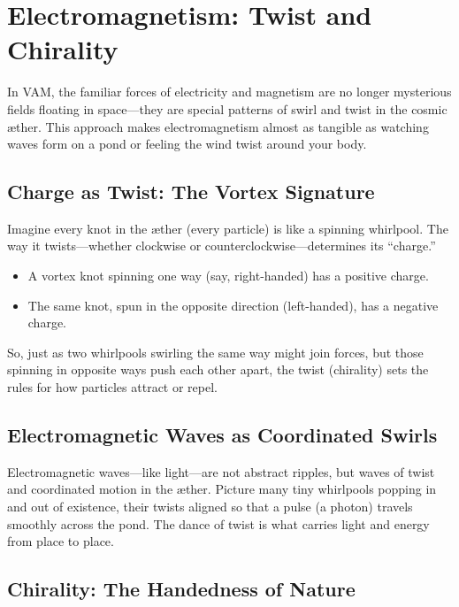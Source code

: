 
\section{Electromagnetism: Twist and Chirality}

In VAM, the familiar forces of electricity and magnetism are no longer mysterious fields floating in space—they are special patterns of swirl and twist in the cosmic æther. This approach makes electromagnetism almost as tangible as watching waves form on a pond or feeling the wind twist around your body.


\subsection*{Charge as Twist: The Vortex Signature}

Imagine every knot in the æther (every particle) is like a spinning whirlpool. The way it twists—whether clockwise or counterclockwise—determines its “charge.”


\begin{itemize}

\item
A vortex knot spinning one way (say, right-handed) has a positive charge.




\item
The same knot, spun in the opposite direction (left-handed), has a negative charge.




\end{itemize}

So, just as two whirlpools swirling the same way might join forces, but those spinning in opposite ways push each other apart, the twist (chirality) sets the rules for how particles attract or repel.


\subsection*{Electromagnetic Waves as Coordinated Swirls}

Electromagnetic waves—like light—are not abstract ripples, but waves of twist and coordinated motion in the æther. Picture many tiny whirlpools popping in and out of existence, their twists aligned so that a pulse (a photon) travels smoothly across the pond. The dance of twist is what carries light and energy from place to place.


\subsection*{Chirality: The Handedness of Nature}

